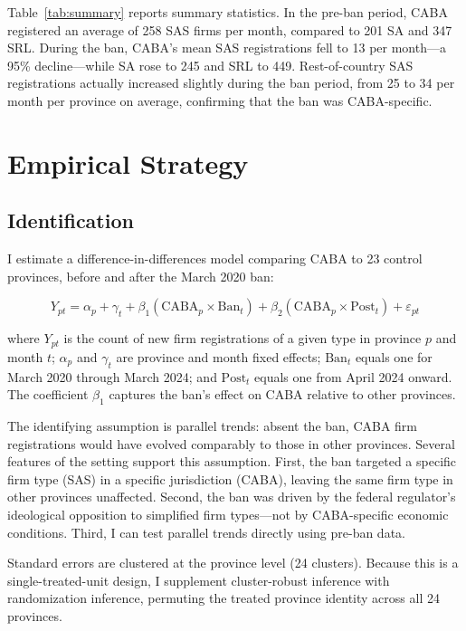 \documentclass[12pt]{article}
\begin{document}


Table~\ref{tab:summary} reports summary statistics. In the pre-ban period, CABA registered an average of 258 SAS firms per month, compared to 201 SA and 347 SRL. During the ban, CABA's mean SAS registrations fell to 13 per month---a 95\% decline---while SA rose to 245 and SRL to 449. Rest-of-country SAS registrations actually increased slightly during the ban period, from 25 to 34 per month per province on average, confirming that the ban was CABA-specific.


\section{Empirical Strategy}

\subsection{Identification}

I estimate a difference-in-differences model comparing CABA to 23 control provinces, before and after the March 2020 ban:

\begin{equation}
Y_{pt} = \alpha_p + \gamma_t + \beta_1 (\text{CABA}_p \times \text{Ban}_t) + \beta_2 (\text{CABA}_p \times \text{Post}_t) + \varepsilon_{pt}
\label{eq:main}
\end{equation}

\noindent where $Y_{pt}$ is the count of new firm registrations of a given type in province $p$ and month $t$; $\alpha_p$ and $\gamma_t$ are province and month fixed effects; $\text{Ban}_t$ equals one for March 2020 through March 2024; and $\text{Post}_t$ equals one from April 2024 onward. The coefficient $\beta_1$ captures the ban's effect on CABA relative to other provinces.

The identifying assumption is parallel trends: absent the ban, CABA firm registrations would have evolved comparably to those in other provinces. Several features of the setting support this assumption. First, the ban targeted a specific firm type (SAS) in a specific jurisdiction (CABA), leaving the same firm type in other provinces unaffected. Second, the ban was driven by the federal regulator's ideological opposition to simplified firm types---not by CABA-specific economic conditions. Third, I can test parallel trends directly using pre-ban data.

Standard errors are clustered at the province level (24 clusters). Because this is a single-treated-unit design, I supplement cluster-robust inference with randomization inference, permuting the treated province identity across all 24 provinces.
\end{document}
